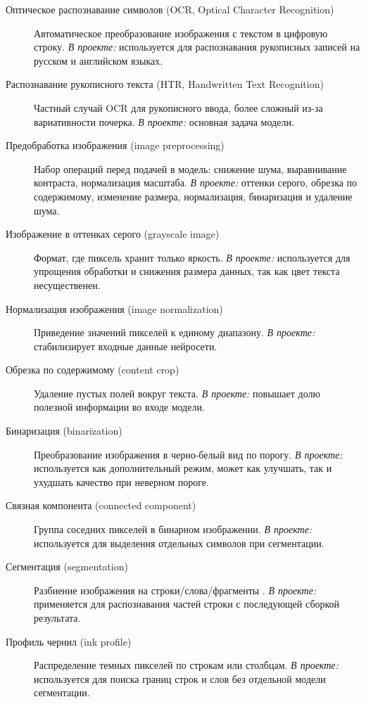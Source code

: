 \documentclass[12pt,a4paper]{article}
\begin{document}
\begin{description}
    \item[Оптическое распознавание символов (OCR, Optical Character Recognition)]
    Автоматическое преобразование изображения с текстом в цифровую строку.
    \textit{В проекте:} используется для распознавания рукописных записей на русском и английском языках.

    \item[Распознавание рукописного текста (HTR, Handwritten Text Recognition)]
    Частный случай OCR для рукописного ввода, более сложный из-за вариативности почерка.
    \textit{В проекте:} основная задача модели.

    \item[Предобработка изображения (image preprocessing)]
    Набор операций перед подачей в модель: снижение шума, выравнивание контраста, нормализация масштаба.
    \textit{В проекте:} оттенки серого, обрезка по содержимому, изменение размера, нормализация, бинаризация и удаление шума.

    \item[Изображение в оттенках серого (grayscale image)]
    Формат, где пиксель хранит только яркость.
    \textit{В проекте:} используется для упрощения обработки и снижения размера данных, так как цвет текста несущественен.

    \item[Нормализация изображения (image normalization)]
    Приведение значений пикселей к единому диапазону.
    \textit{В проекте:} стабилизирует входные данные нейросети.

    \item[Обрезка по содержимому (content crop)]
    Удаление пустых полей вокруг текста.
    \textit{В проекте:} повышает долю полезной информации во входе модели.

    \item[Бинаризация (binarization)]
    Преобразование изображения в черно-белый вид по порогу.
    \textit{В проекте:} используется как дополнительный режим, может как улучшать, так и ухудшать качество при неверном пороге.

    \item[Связная компонента (connected component)]
    Группа соседних пикселей в бинарном изображении.
    \textit{В проекте:} используется для выделения отдельных символов при сегментации.

    \item[Сегментация (segmentation)]
    Разбиение изображения на строки/слова/фрагменты \cite{segmentation2009}.
    \textit{В проекте:} применяется для распознавания частей строки с последующей сборкой результата.

    \item[Профиль чернил (ink profile)]
    Распределение темных пикселей по строкам или столбцам.
    \textit{В проекте:} используется для поиска границ строк и слов без отдельной модели сегментации.
\end{description}
\end{document}
